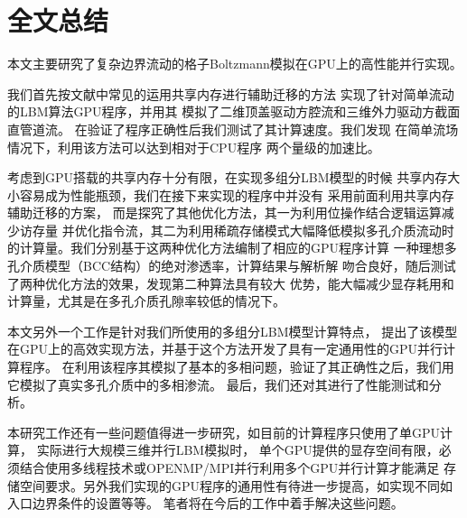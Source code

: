 \chapter{全文总结}
本文主要研究了复杂边界流动的格子Boltzmann模拟在GPU上的高性能并行实现。

我们首先按文献中常见的运用共享内存进行辅助迁移的方法
实现了针对简单流动的LBM算法GPU程序，并用其
模拟了二维顶盖驱动方腔流和三维外力驱动方截面直管道流。
在验证了程序正确性后我们测试了其计算速度。我们发现
在简单流场情况下，利用该方法可以达到相对于CPU程序
两个量级的加速比。

考虑到GPU搭载的共享内存十分有限，在实现多组分LBM模型的时候
共享内存大小容易成为性能瓶颈，我们在接下来实现的程序中并没有
采用前面利用共享内存辅助迁移的方案，
而是探究了其他优化方法，其一为利用位操作结合逻辑运算减少访存量
并优化指令流，其二为利用稀疏存储模式大幅降低模拟多孔介质流动时
的计算量。我们分别基于这两种优化方法编制了相应的GPU程序计算
一种理想多孔介质模型（BCC结构）的绝对渗透率，计算结果与解析解
吻合良好，随后测试了两种优化方法的效果，发现第二种算法具有较大
优势，能大幅减少显存耗用和计算量，尤其是在多孔介质孔隙率较低的情况下。

本文另外一个工作是针对我们所使用的多组分LBM模型计算特点，
提出了该模型在GPU上的高效实现方法，并基于这个方法开发了具有一定通用性的GPU并行计算程序。
在利用该程序其模拟了基本的多相问题，验证了其正确性之后，我们用它模拟了真实多孔介质中的多相渗流。
最后，我们还对其进行了性能测试和分析。

本研究工作还有一些问题值得进一步研究，如目前的计算程序只使用了单GPU计算，
实际进行大规模三维并行LBM模拟时，
单个GPU提供的显存空间有限，必须结合使用多线程技术或OPENMP/MPI并行利用多个GPU并行计算才能满足
存储空间要求。另外我们实现的GPU程序的通用性有待进一步提高，如实现不同如入口边界条件的设置等等。
笔者将在今后的工作中着手解决这些问题。
